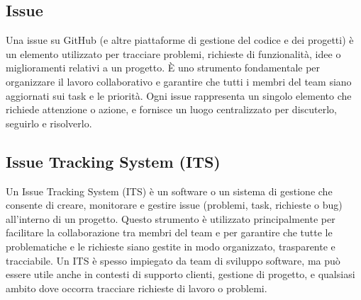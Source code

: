 \subsection*{Issue}
Una issue su GitHub (e altre piattaforme di gestione del codice e dei progetti) è un elemento utilizzato per tracciare problemi, richieste di funzionalità, 
idee o miglioramenti relativi a un progetto. È uno strumento fondamentale per organizzare il lavoro collaborativo e garantire che tutti i membri del team 
siano aggiornati sui task e le priorità. Ogni issue rappresenta un singolo elemento che richiede attenzione o azione, e fornisce un luogo centralizzato per 
discuterlo, seguirlo e risolverlo.

\hypertarget{sec:issue_tracking_system}{}
\subsection*{Issue Tracking System (ITS)}
Un Issue Tracking System (ITS) è un software o un sistema di gestione che consente di creare, monitorare e gestire issue 
(problemi, task, richieste o bug) all'interno di un progetto. Questo strumento è utilizzato principalmente per facilitare la collaborazione 
tra membri del team e per garantire che tutte le problematiche e le richieste siano gestite in modo organizzato, trasparente e tracciabile. 
Un ITS è spesso impiegato da team di sviluppo software, ma può essere utile anche in contesti di supporto clienti, gestione di progetto, e 
qualsiasi ambito dove occorra tracciare richieste di lavoro o problemi.

\newpage
